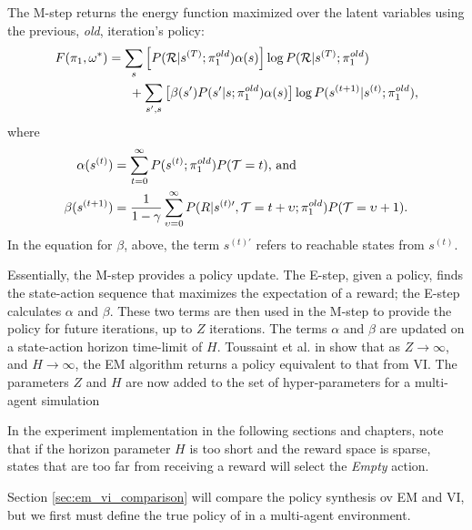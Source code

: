     \par
    The M-step returns the energy function maximized over the latent variables using the previous, \textit{old},
    iteration's policy:
    \begin{equation} \label{eq:M_step}
        \begin{split}
            F(\pi_{1},\omega^*)
                & = \sum_s \left[ P(\mathcal{R}|s^{(T)};\pi_{1}^{old})\alpha(s)\right]
                        \log P(\mathcal{R}|s^{(T)};\pi_{1}^{old}) \\
                &\quad\ \ + \sum_{s',s}\left[ \beta(s')P(s'|s;\pi_{1}^{old})\alpha(s)\right]
                        \log P(s^{(t+1)}|s^{(t)};\pi_{1}^{old}),
        \end{split}
    \end{equation}
    where
    \begin{align*}
        \alpha(s^{(t)}) & = \sum_{t=0}^\infty P(s^{(t)}; \pi_{1}^{old})P(\mathcal{T}=t) \text{, and}\\
        \beta(s^{(t+1)}) & = \frac{1}{1-\gamma} \sum_{\upsilon=0}^{\infty}
            P(R|s^{(t)\prime},\mathcal{T}=t+\upsilon;\pi_{1}^{old})P(\mathcal{T}=\upsilon+1).
    \end{align*}
    \noindent
    In the equation for $\beta$, above, the term $s^{(t)\prime}$ refers to reachable states from $s^{(t)}$.

    Essentially, the M-step provides a policy update. The E-step, given a policy, finds the state-action sequence that
    maximizes the expectation of a reward; the E-step calculates $\alpha$ and $\beta$. These two terms are then used in
    the M-step to provide the policy for future iterations, up to $Z$ iterations. The terms $\alpha$ and $\beta$ are
    updated on a state-action horizon time-limit of $H$.  Toussaint et al. in \cite{toussaint2010expectation} show that
    as $Z\rightarrow{}\infty$, and $H\rightarrow{}\infty$, the EM algorithm returns a policy equivalent to that from VI.
    The parameters $Z$ and $H$ are now added to the set of hyper-parameters for a multi-agent simulation

\begin{remark}
    In the experiment implementation in the following sections and chapters, note that if the horizon parameter $H$ is
    too short and the reward space is sparse, states that are too far from receiving a reward will select the
    \emph{Empty} action.
\end{remark}

    Section \ref{sec:em_vi_comparison} will compare the policy synthesis ov \ac{EM} and VI, but we first must define the
    true policy of  in a multi-agent environment.




